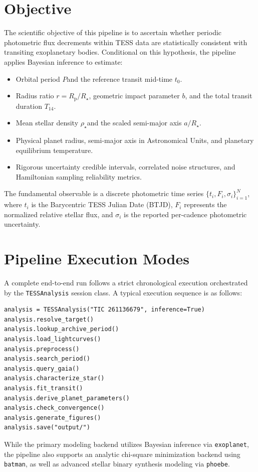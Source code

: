 \documentclass[12pt,a4paper,oneside]{report}
\newcommand{\Rstar}{\ensuremath{R_{\star}}}
\newcommand{\rhoStar}{\ensuremath{\rho_{\star}}}
\newcommand{\Rp}{\ensuremath{R_{\mathrm{p}}}}
\newcommand{\Porb}{\ensuremath{P}}
\newcommand{\Tfourteen}{\ensuremath{T_{14}}}
\newcommand{\tzero}{\ensuremath{t_{0}}}
\newcommand{\code}[1]{\texttt{\small #1}}
\begin{document}
\section{Objective}
The scientific objective of this pipeline is to ascertain whether periodic photometric flux decrements within TESS data are statistically consistent with transiting exoplanetary bodies. Conditional on this hypothesis, the pipeline applies Bayesian inference to estimate:
\begin{itemize}
  \item Orbital period \Porb and the reference transit mid-time \tzero.
  \item Radius ratio \(r=\Rp/\Rstar\), geometric impact parameter \(b\), and the total transit duration \Tfourteen.
  \item Mean stellar density \rhoStar and the scaled semi-major axis \(a/\Rstar\).
  \item Physical planet radius, semi-major axis in Astronomical Units, and planetary equilibrium temperature.
  \item Rigorous uncertainty credible intervals, correlated noise structures, and Hamiltonian sampling reliability metrics.
\end{itemize}

The fundamental observable is a discrete photometric time series \(\{t_i,F_i,\sigma_i\}_{i=1}^{N}\), where \(t_i\) is the Barycentric TESS Julian Date (BTJD), \(F_i\) represents the normalized relative stellar flux, and \(\sigma_i\) is the reported per-cadence photometric uncertainty.

\section{Pipeline Execution Modes}
A complete end-to-end run follows a strict chronological execution orchestrated by the \code{TESSAnalysis} session class. A typical execution sequence is as follows:
\begin{lstlisting}
analysis = TESSAnalysis("TIC 261136679", inference=True)
analysis.resolve_target()
analysis.lookup_archive_period()
analysis.load_lightcurves()
analysis.preprocess()
analysis.search_period()
analysis.query_gaia()
analysis.characterize_star()
analysis.fit_transit()
analysis.derive_planet_parameters()
analysis.check_convergence()
analysis.generate_figures()
analysis.save("output/")
\end{lstlisting}

While the primary modeling backend utilizes Bayesian inference via \code{exoplanet}, the pipeline also supports an analytic chi-square minimization backend using \code{batman}, as well as advanced stellar binary synthesis modeling via \code{phoebe}.
\end{document}
